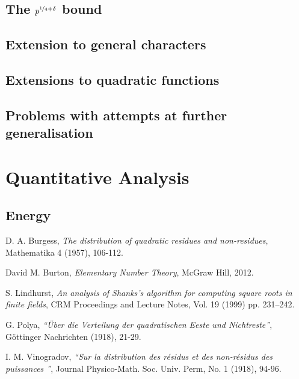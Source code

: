 \documentclass{report}
\begin{document}
\section{The $p^{\nicefrac{1}{4}+\delta}$ bound}

%
%
\section{Extension to general characters}
%
%
\section{Extensions to quadratic functions}
%
%
\section{Problems with attempts at further generalisation}
%
\chapter{Quantitative Analysis}
\section{Energy}
%
%
\begin{thebibliography}{9}

 D. A. Burgess,
\textit{The distribution of quadratic residues and non-residues},
Mathematika 4 (1957), 106-112.

David M. Burton, \textit{Elementary Number Theory},
McGraw Hill, 2012.

S. Lindhurst, \textit{An analysis of Shanks's algorithm for computing square roots in finite fields},
CRM Proceedings and Lecture Notes, Vol. 19 (1999) pp. 231–242.

G. Polya,
\textit{``{\"U}ber die Verteilung der quadratischen Eeste und Nichtreste''},
G{\"o}ttinger Nachrichten (1918), 21-29.

I. M. Vinogradov,
\textit{``Sur la distribution des r{\'e}sidus et des non-r{\'e}sidus des puissances ''},
Journal Physico-Math. Soc. Univ. Perm, No. 1 (1918), 94-96.

\end{thebibliography}
%
\end{document}
